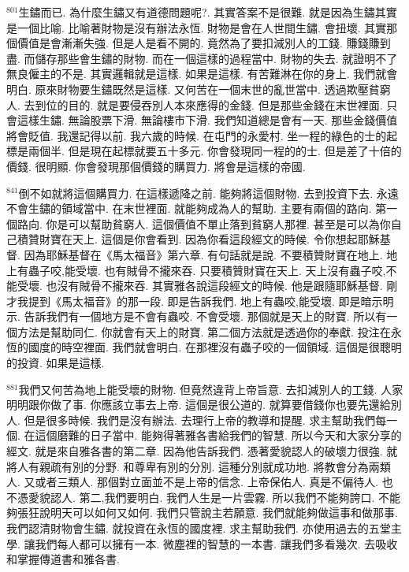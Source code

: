 \documentclass{book}
\begin{document}
$^{801}$生鏽而已.
為什麼生鏽又有道德問題呢?.
其實答案不是很難.
就是因為生鏽其實是一個比喻.
比喻著財物是沒有辦法永恆.
財物是會在人世間生鏽.
會扭壞.
其實那個價值是會漸漸失強.
但是人是看不開的.
竟然為了要扣減別人的工錢.
賺錢賺到盡.
而儲存那些會生鏽的財物.
而在一個這樣的過程當中.
財物的失去.
就證明不了無良僱主的不是.
其實邏輯就是這樣.
如果是這樣.
有苦難淋在你的身上.
我們就會明白.
原來財物要生鏽既然是這樣.
又何苦在一個末世的亂世當中.
透過欺壓貧窮人.
去到位的目的.
就是要侵吞別人本來應得的金錢.
但是那些金錢在末世裡面.
只會這樣生鏽.
無論股票下滑.
無論樓市下滑.
我們知道總是會有一天.
那些金錢價值將會貶值.
我還記得以前.
我六歲的時候.
在屯門的永愛村.
坐一程的綠色的士的起標是兩個半.
但是現在起標就要五十多元.
你會發現同一程的的士.
但是差了十倍的價錢.
很明顯.
你會發現那個價錢的購買力.
將會是這樣的帝國.

$^{841}$倒不如就將這個購買力.
在這樣遞降之前.
能夠將這個財物.
去到投資下去.
永遠不會生鏽的領域當中.
在末世裡面.
就能夠成為人的幫助.
主要有兩個的路向.
第一個路向.
你是可以幫助貧窮人.
這個價值不單止落到貧窮人那裡.
甚至是可以為你自己積贊財寶在天上.
這個是你會看到.
因為你看這段經文的時候.
令你想起耶穌基督.
因為耶穌基督在《馬太福音》第六章.
有句話就是說.
不要積贊財寶在地上.
地上有蟲子咬,能受壞.
也有賊骨不攏來吞.
只要積贊財寶在天上.
天上沒有蟲子咬,不能受壞.
也沒有賊骨不攏來吞.
其實雅各說這段經文的時候.
他是跟隨耶穌基督.
剛才我提到《馬太福音》的那一段.
即是告訴我們.
地上有蟲咬,能受壞.
即是暗示明示.
告訴我們有一個地方是不會有蟲咬.
不會受壞.
那個就是天上的財寶.
所以有一個方法是幫助同仁.
你就會有天上的財寶.
第二個方法就是透過你的奉獻.
投注在永恆的國度的時空裡面.
我們就會明白.
在那裡沒有蟲子咬的一個領域.
這個是很聰明的投資.
如果是這樣.

$^{881}$我們又何苦為地上能受壞的財物.
但竟然違背上帝旨意.
去扣減別人的工錢.
人家明明跟你做了事.
你應該立事去上帝.
這個是很公道的.
就算要借錢你也要先還給別人.
但是很多時候.
我們是沒有辦法.
去理行上帝的教導和提醒.
求主幫助我們每一個.
在這個磨難的日子當中.
能夠得著雅各書給我們的智慧.
所以今天和大家分享的經文.
就是來自雅各書的第二章.
因為他告訴我們.
憑著愛貌認人的破壞力很強.
就將人有親疏有別的分野.
和尊卑有別的分別.
這種分別就成功地.
將教會分為兩類人.
又或者三類人.
那個對立面並不是上帝的信念.
上帝保佑人.
真是不偏待人.
也不憑愛貌認人.
第二,我們要明白.
我們人生是一片雲霧.
所以我們不能夠誇口.
不能夠張狂說明天可以如何又如何.
我們只管說主若願意.
我們就能夠做這事和做那事.
我們認清財物會生鏽.
就投資在永恆的國度裡.
求主幫助我們.
亦使用過去的五堂主學.
讓我們每人都可以擁有一本.
微塵裡的智慧的一本書.
讓我們多看幾次.
去吸收和掌握傳道書和雅各書.
\end{document}
